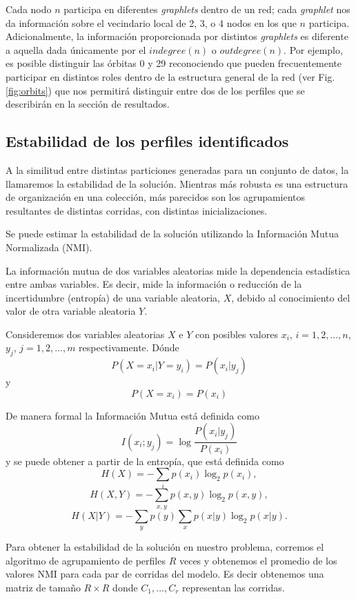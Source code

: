 Cada nodo $n$ participa en diferentes \textit{graphlets} dentro de un red; cada \textit{graphlet} nos da información sobre el vecindario local de 2, 3, o 4 nodos en los que $n$ participa. Adicionalmente, la información proporcionada por distintos \textit{graphlets} es diferente a aquella dada únicamente por el $indegree(n)$ o $outdegree(n)$. Por ejemplo, es posible distinguir las órbitas 0 y 29 reconociendo que pueden frecuentemente participar en distintos roles dentro de la estructura general de la red (ver Fig. \ref{fig:orbits}) que nos permitirá distinguir entre dos de los perfiles que se describirán en la sección de resultados.

\subsection{Estabilidad de los perfiles identificados}
\label{NMI}

A la similitud entre distintas particiones generadas para un conjunto de datos, la llamaremos la estabilidad de la solución. Mientras más robusta es una estructura de organización en una colección, más parecidos son los agrupamientos resultantes de distintas corridas, con distintas inicializaciones.

Se puede estimar la estabilidad de la solución utilizando la Información Mutua Normalizada (NMI).

La información mutua de dos variables aleatorias mide la dependencia estadística entre ambas variables. Es decir, mide la información o reducción de la incertidumbre (entropía) de una variable aleatoria, $X$, debido al conocimiento del valor de otra variable aleatoria $Y$.

Consideremos dos variables aleatorias $X$ e $Y$ con posibles valores $x_i$, $i=1,2,...,n$, $y_j$, $j=1,2,...,m$ respectivamente. Dónde $$
{\displaystyle P(X=x_{i}|Y=y_{i})=P(x_{i}|y_{j})}$$ y $${\displaystyle P(X=x_{i})=P(x_{i})}$$

De manera formal la Información Mutua está definida como
$$ {\displaystyle I(x_{i};y_{j})=\log {\frac {P(x_{i}|y_{j})}{P(x_{i})}}} $$
y se puede obtener a partir de la entropía, que está definida como
$${\displaystyle H(X)=-\sum _{i}p(x_{i})\log _{2}p(x_{i})},$$
$${\displaystyle H(X,Y)=-\sum _{x,y}p(x,y)\log _{2}p(x,y)},$$
$${\displaystyle H(X|Y)=-\sum _{y}p(y)\sum _{x}p(x|y)\log _{2}p(x|y)}.$$

Para obtener la estabilidad de la solución en nuestro problema, corremos el algoritmo de agrupamiento de perfiles $R$ veces y obtenemos el promedio de los valores NMI para cada par de corridas del modelo. Es decir obtenemos una matriz de tamaño $R \times R$ donde $C_1,\ldots,C_r$ representan las corridas.

